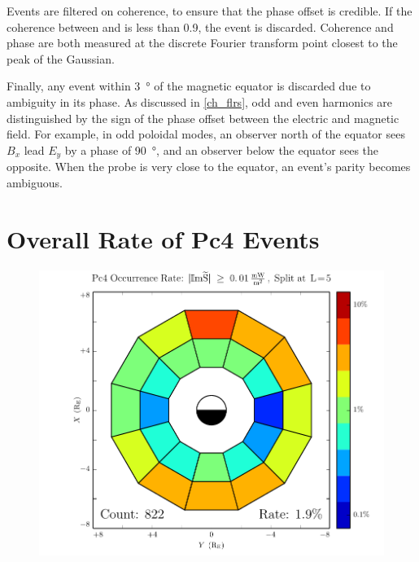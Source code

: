 Events are filtered on coherence, to ensure that the phase offset is credible. If the coherence between  and  is less than 0.9, the event is discarded. Coherence and phase are both measured at the discrete Fourier transform point closest to the peak of the Gaussian. 

Finally, any event within \SI{3}{\degree} of the magnetic equator is discarded due to ambiguity in its phase. As discussed in \cref{ch_flrs}, odd and even harmonics are distinguished by the sign of the phase offset between the electric and magnetic field. For example, in odd poloidal modes, an observer north of the equator sees $B_x$ lead $E_y$ by a phase of \SI{90}{\degree}, and an observer below the equator sees the opposite. When the probe is very close to the equator, an event's parity becomes ambiguous. 


\section{Overall Rate of Pc4 Events}
  \label{sec_total}

\begin{figure}[!htb]
    \centering
    \includegraphics[width=\textwidth]{figures/rate_all.pdf}
    \caption[Pc4 Rate]{
    }
    \label{fig_rate_all}
\end{figure}

